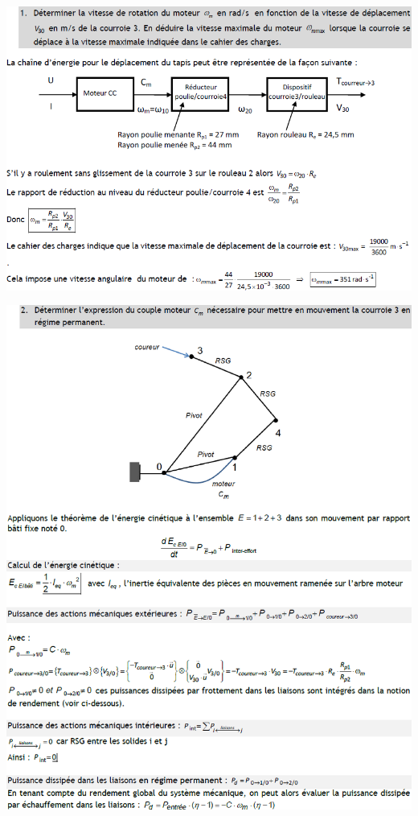 \documentclass[10pt,fleqn]{article} %
\begin{document}
\begin{center}
\includegraphics[width=\linewidth]{images/cor_01.png}
\end{center}

\begin{center}
\includegraphics[width=\linewidth]{images/cor_02.png}
\end{center}
\end{document}
